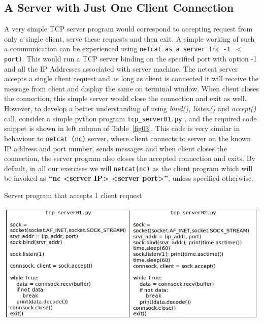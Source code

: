 \begin{multicols}{2}
\section{A Server with Just One Client Connection}

A very simple TCP server program would correspond to accepting request from only a single client, serve these requests and then exit. A simple working of such a communication can be experienced using \texttt{netcat as a server (nc -1 $<$port)}. This would run a TCP server binding on the specified port with option -1 and all the IP Addresses associated with server machine. The netcat server accepts a single client request and as long as client is connected it will receive the message from client and display the same on terminal window. When client closes the connection, this simple server would close the connection and exit as well. However, to develop a better understanding of using \textit{bind(), listen()} and \textit{accept()} call, consider a simple python program \texttt{tcp\_server01.py} \cite{art1-key11}, and the required code snippet is shown in left column of Table~\ref{fig03}. This code is very similar in behaviour to \texttt{netcat (nc)} server, where client connects to server on the known IP address and port number, sends messages and when client closes the connection, the server program also closes the accepted connection and exits. By default, in all our exercises we will \texttt{netcat(nc)} as the client program which will be invoked as \textbf{“nc <server IP> <server port>”}, unless specified otherwise.

\end{multicols}

\setcounter{section}{0}
\begin{table}[H]
\centering
\caption{Server program that accepts 1 client request}\label{fig03}
\includegraphics[scale=3.05]{src/Figures/chap1/fig03.jpg}
\end{table}


